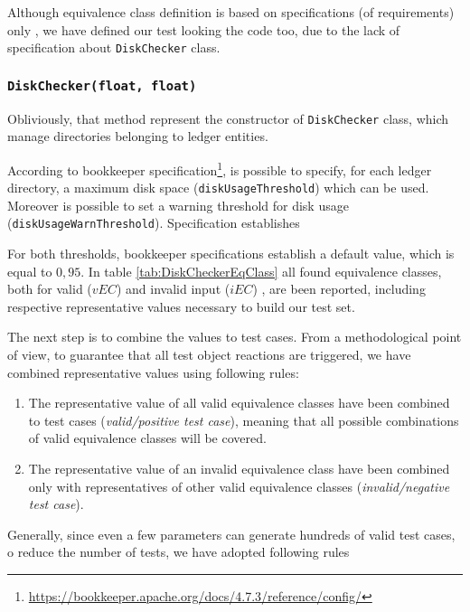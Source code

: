 \documentclass[conference]{IEEEtran}
\begin{document}
Although equivalence class definition is based on specifications (of requirements) only \cite{FoundationSoftwareTesting}, we have defined our test looking the code too, due to the lack of specification about \texttt{DiskChecker} class.

\subsubsection{\texttt{DiskChecker(float, float)}}

Obliviously, that method represent the constructor of \texttt{DiskChecker} class, which manage directories belonging to ledger entities. 

According to bookkeeper specification\footnote{\url{https://bookkeeper.apache.org/docs/4.7.3/reference/config/}}, is possible to specify, for each ledger directory, a maximum disk space (\texttt{diskUsageThreshold}) which can be used. Moreover is possible to set a warning threshold for disk usage (\texttt{diskUsageWarnThreshold}). Specification establishes 

\vspace{5pt}
\vspace{5pt}

For both thresholds, bookkeeper specifications establish a default value, which is equal to $0,95$. In table \ref{tab:DiskCheckerEqClass} all found equivalence classes, both for valid ($vEC$) and invalid input ($iEC$) , are been reported, including respective representative values necessary to build our test set. 

The next step is to combine the values to test cases. From a methodological point of view, to guarantee that all test object reactions are triggered, we have combined representative values using following rules:
\begin{enumerate}
\item The representative value of all valid equivalence classes have been combined to test cases (\textit{valid/positive test case}), meaning that all possible combinations of valid equivalence classes will be covered. 
\item The representative value of an invalid equivalence class have been combined only with representatives of other valid equivalence classes (\textit{invalid/negative test case}).
\end{enumerate}

Generally, since even a few parameters can generate hundreds of valid test cases, o reduce the number of tests, we have adopted following rules
\end{document}
